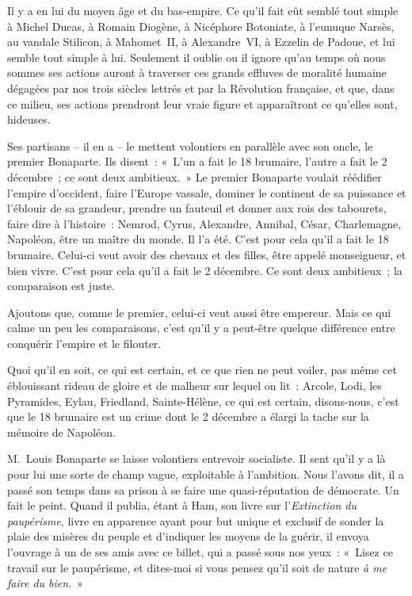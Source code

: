 \documentclass[french,twoside]{book} %
\begin{document}
Il y a en lui du moyen âge et du bas-empire. Ce qu’il fait eût semblé tout simple à Michel Ducas, à Romain Diogène, à Nicéphore Botoniate, à l’eunuque Narsès, au vandale Stilicon, à Mahomet II, à Alexandre VI, à Ezzelin de Padoue, et lui semble tout simple à lui. Seulement il oublie ou il ignore qu’au temps où nous sommes ses actions auront à traverser ces grands effluves de moralité humaine dégagées par nos trois siècles lettrés et par la Révolution française, et que, dans ce milieu, ses actions prendront leur vraie figure et apparaîtront ce qu’elles sont, hideuses.\par
Ses partisans – il en a – le mettent volontiers en parallèle avec son oncle, le premier Bonaparte. Ils disent : « L’un a fait le 18 brumaire, l’autre a fait le 2 décembre ; ce sont deux ambitieux. » Le premier Bonaparte voulait réédifier l’empire d’occident, faire l’Europe vassale, dominer le continent de sa puissance et l’éblouir de sa grandeur, prendre un fauteuil et donner aux rois des tabourets, faire dire à l’histoire : Nemrod, Cyrus, Alexandre, Annibal, César, Charlemagne, Napoléon, être un maître du monde. Il l’a été. C’est pour cela qu’il a fait le 18 brumaire. Celui-ci veut avoir des chevaux et des filles, être appelé monseigneur, et bien vivre. C’est pour cela qu’il a fait le 2 décembre. Ce sont deux ambitieux ; la comparaison est juste.\par
Ajoutons que, comme le premier, celui-ci veut aussi être empereur. Mais ce qui calme un peu les comparaisons, c’est qu’il y a peut-être quelque différence entre conquérir l’empire et le filouter.\par
Quoi qu’il en soit, ce qui est certain, et ce que rien ne peut voiler, pas même cet éblouissant rideau de gloire et de malheur sur lequel on lit : Arcole, Lodi, les Pyramides, Eylau, Friedland, Sainte-Hélène, ce qui est certain, disons-nous, c’est que le 18 brumaire est un crime dont le 2 décembre a élargi la tache sur la mémoire de Napoléon.\par
M. Louis Bonaparte se laisse volontiers entrevoir socialiste. Il sent qu’il y a là pour lui une sorte de champ vague, exploitable à l’ambition. Nous l’avons dit, il a passé son temps dans sa prison à se faire une quasi-réputation de démocrate. Un fait le peint. Quand il publia, étant à Ham, son livre sur l’\emph{Extinction du paupérisme}, livre en apparence ayant pour but unique et exclusif de sonder la plaie des misères du peuple et d’indiquer les moyens de la guérir, il envoya l’ouvrage à un de ses amis avec ce billet, qui a passé sous nos yeux : « Lisez ce travail sur le paupérisme, et dites-moi si vous pensez qu’il soit de nature \emph{à me faire du bien}. »\par
\end{document}

